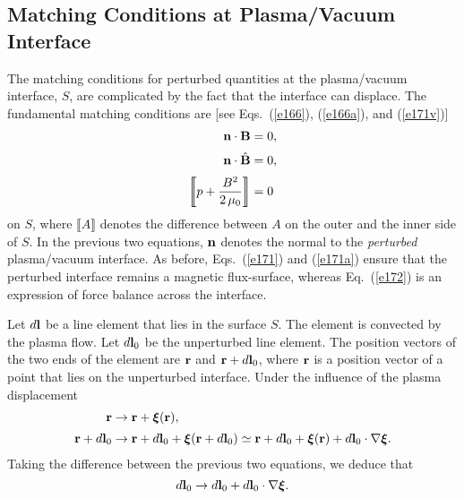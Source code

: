 \documentclass[12pt,prb,aps,notitlepage]{revtex4-1}
\newcommand{\bxi}{\mbox{\boldmath$\xi$}}
\begin{document}
\subsection{Matching Conditions at Plasma/Vacuum Interface}
The matching conditions for perturbed quantities at the plasma/vacuum interface, $S$,  are complicated by the fact that the interface can
displace. The fundamental matching conditions are [see Eqs.~(\ref{e166}), (\ref{e166a}), and (\ref{e171v})]
\begin{align}
{\bf n}\cdot{\bf B}& = 0,\label{e171}\\[0.5ex]
{\bf n}\cdot\hat{\bf B} &= 0,\label{e171a}\\[0.5ex]
\left\llbracket p+ \frac{B^2}{2\,\mu_0}\right\rrbracket &= 0\label{e172}
\end{align}
on $S$, where $\llbracket A\rrbracket$ denotes the difference between $A$ on the outer and the inner side of $S$. In the previous
two equations, ${\bf n}$ denotes the normal to the {\em perturbed}\/ plasma/vacuum interface. As before, Eqs.~(\ref{e171}) and (\ref{e171a}) ensure that the
perturbed interface remains a magnetic flux-surface, whereas Eq.~(\ref{e172}) is an expression of force balance across the interface. 

Let $d{\bf l}$ be a line element that lies in the surface $S$. The element is convected by the plasma flow. Let $d{\bf l}_0$ be the unperturbed
line element. 
The position vectors of the two ends of the element are ${\bf r}$ and ${\bf r}+d{\bf l}_0$, where ${\bf r}$ is a position vector
of a point that lies on the unperturbed interface. Under the influence of the plasma displacement
\begin{align}
{\bf r} &\rightarrow {\bf r} +\bxi(\bf r),\\[0.5ex]
{\bf r}+ d{\bf l}_0&\rightarrow {\bf r}+ d{\bf l}_0 + \bxi({\bf r}+d{\bf l}_0) \simeq {\bf r}+ d{\bf l}_0+\bxi({\bf r})+d{\bf l}_0\cdot\nabla\bxi.
\end{align}
Taking the difference between the previous two equations, we deduce that
\begin{equation}
d{\bf l}_0\rightarrow d{\bf l}_0 + d{\bf l}_0\cdot\nabla\bxi.
\end{equation}
\end{document}
